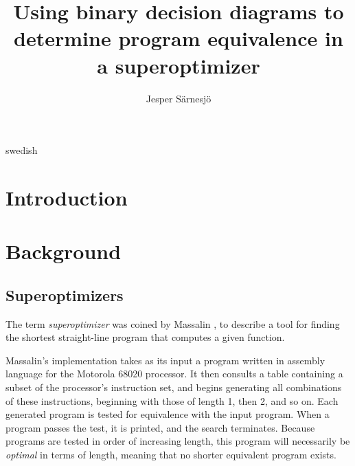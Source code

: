 \documentclass[a4paper,11pt]{kth-mag}
\title{Using binary decision diagrams to determine program equivalence in a superoptimizer}
\subtitle{}
\author{Jesper Särnesjö}
\date{}
\begin{document}
\frontmatter

\pagestyle{empty}

\removepagenumbers

\maketitle


\begin{abstract}
\end{abstract}

\clearpage

\begin{foreignabstract}{swedish}
\end{foreignabstract}

\clearpage

\tableofcontents*

\mainmatter

\pagestyle{newchap}

\chapter{Introduction}
\label{ch:introduction}

\chapter{Background}
\label{ch:background}

\section{Superoptimizers}

The term \emph{superoptimizer} was coined by Massalin \cite{massalin87}, to describe a tool for finding the shortest straight-line program that computes a given function.

Massalin's implementation takes as its input a program written in assembly language for the Motorola 68020 processor.
It then consults a table containing a subset of the processor's instruction set, and begins generating all combinations of these instructions, beginning with those of length 1, then 2, and so on.
Each generated program is tested for equivalence with the input program.
When a program passes the test, it is printed, and the search terminates.
Because programs are tested in order of increasing length, this program will necessarily be \emph{optimal} in terms of length, meaning that no shorter equivalent program exists.
\end{document}
